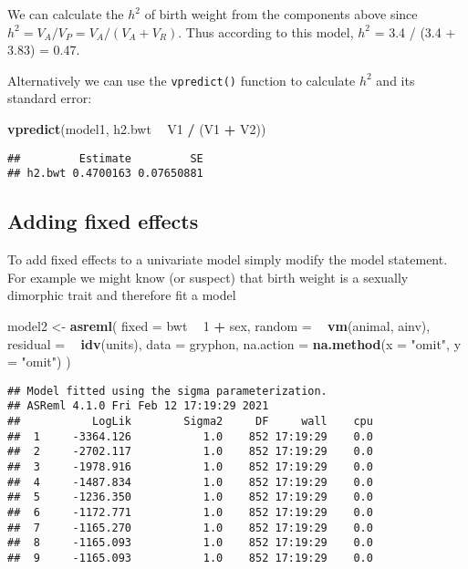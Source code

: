 \documentclass[12pt,]{book}
\newenvironment{Shaded}{\begin{snugshade}}{\end{snugshade}}
\newcommand{\DataTypeTok}[1]{\textcolor[rgb]{0.13,0.29,0.53}{#1}}
\newcommand{\DecValTok}[1]{\textcolor[rgb]{0.00,0.00,0.81}{#1}}
\newcommand{\KeywordTok}[1]{\textcolor[rgb]{0.13,0.29,0.53}{\textbf{#1}}}
\newcommand{\NormalTok}[1]{#1}
\newcommand{\OperatorTok}[1]{\textcolor[rgb]{0.81,0.36,0.00}{\textbf{#1}}}
\newcommand{\StringTok}[1]{\textcolor[rgb]{0.31,0.60,0.02}{#1}}
\begin{document}
We can calculate the \(h^2\) of birth weight from the components above since \(h^2 = V_A/V_P = V_A/(V_A+V_R)\). Thus according to this model, \(h^2\) = 3.4 / (3.4 + 3.83) = 0.47.

Alternatively we can use the \texttt{vpredict()} function to calculate \(h^2\) and its standard error:

\begin{Shaded}
\begin{Highlighting}[]
\KeywordTok{vpredict}\NormalTok{(model1, h2.bwt }\OperatorTok{~}\StringTok{ }\NormalTok{V1 }\OperatorTok{/}\StringTok{ }\NormalTok{(V1 }\OperatorTok{+}\StringTok{ }\NormalTok{V2))}
\end{Highlighting}
\end{Shaded}

\begin{verbatim}
##         Estimate         SE
## h2.bwt 0.4700163 0.07650881
\end{verbatim}

\hypertarget{adding-fixed-effects}{%
\subsection{Adding fixed effects}\label{adding-fixed-effects}}

To add fixed effects to a univariate model simply modify the model statement. For example we might know (or suspect) that birth weight is a sexually dimorphic trait and therefore fit a model

\begin{Shaded}
\begin{Highlighting}[]
\NormalTok{model2 <-}\StringTok{ }\KeywordTok{asreml}\NormalTok{(}
  \DataTypeTok{fixed =}\NormalTok{ bwt }\OperatorTok{~}\StringTok{ }\DecValTok{1} \OperatorTok{+}\StringTok{ }\NormalTok{sex,}
  \DataTypeTok{random =} \OperatorTok{~}\StringTok{ }\KeywordTok{vm}\NormalTok{(animal, ainv),}
  \DataTypeTok{residual =} \OperatorTok{~}\StringTok{ }\KeywordTok{idv}\NormalTok{(units),}
  \DataTypeTok{data =}\NormalTok{ gryphon,}
  \DataTypeTok{na.action =} \KeywordTok{na.method}\NormalTok{(}\DataTypeTok{x =} \StringTok{"omit"}\NormalTok{, }\DataTypeTok{y =} \StringTok{"omit"}\NormalTok{)}
\NormalTok{)}
\end{Highlighting}
\end{Shaded}

\begin{verbatim}
## Model fitted using the sigma parameterization.
## ASReml 4.1.0 Fri Feb 12 17:19:29 2021
##           LogLik        Sigma2     DF     wall    cpu
##  1     -3364.126           1.0    852 17:19:29    0.0
##  2     -2702.117           1.0    852 17:19:29    0.0
##  3     -1978.916           1.0    852 17:19:29    0.0
##  4     -1487.834           1.0    852 17:19:29    0.0
##  5     -1236.350           1.0    852 17:19:29    0.0
##  6     -1172.771           1.0    852 17:19:29    0.0
##  7     -1165.270           1.0    852 17:19:29    0.0
##  8     -1165.093           1.0    852 17:19:29    0.0
##  9     -1165.093           1.0    852 17:19:29    0.0
\end{verbatim}
\end{document}
